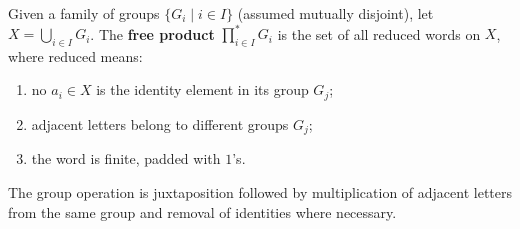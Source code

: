 \begin{definition}
Given a family of groups $\{G_i \mid i \in I\}$ (assumed mutually disjoint), let $X = \bigcup_{i \in I} G_i$. The \textbf{free product} $\prod_{i \in I}^* G_i$ is the set of all reduced words on $X$, where reduced means:
\begin{enumerate}
    \item[(i)] no $a_i \in X$ is the identity element in its group $G_j$;
    \item[(ii)] adjacent letters belong to different groups $G_j$;
    \item[(iii)] the word is finite, padded with $1$'s.
\end{enumerate}
The group operation is juxtaposition followed by multiplication of adjacent letters from the same group and removal of identities where necessary.
\end{definition}
